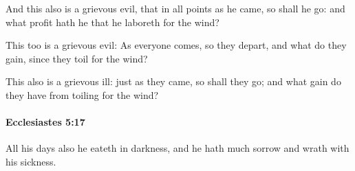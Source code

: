 			\begin{versebox}
					\item[BHS] 
					\item[LXX] 
					\item[ASV] And this also is a grievous evil, that in all points as he came, so shall he go: and what profit hath he that he laboreth for the wind?
					\item[NIV] This too is a grievous evil: As everyone comes, so they depart, and what do they gain, since they toil for the wind?
					\item[NRSV] This also is a grievous ill: just as they came, so shall they go; and what gain do they have from toiling for the wind?
			\end{versebox}

		\paragraph{Ecclesiastes 5:17} %
			\label{ECCLESIASTES-5-17}

			All his days also he eateth in darkness, and he hath much sorrow and wrath with his sickness.

